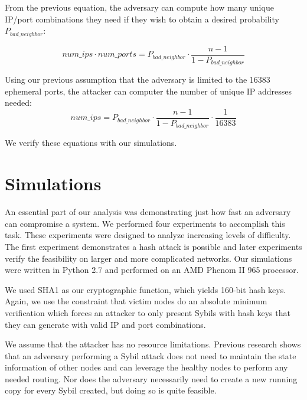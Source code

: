 \documentclass[11pt,conference]{IEEEtran}
\begin{document}
From the previous equation, the adversary can compute how many unique IP/port combinations they need if they wish to obtain a desired probability $P_{bad\_neighbor}$:

$$ num\_ips \cdot num\_ports = P_{bad\_neighbor} \cdot \frac{n - 1}{1 - P_{bad\_neighbor} }$$

Using our previous assumption that the adversary is limited to the 16383 ephemeral ports, the attacker can computer the number of unique IP addresses needed:
$$ num\_ips  =  P_{bad\_neighbor} \cdot \frac{n - 1}{1 - P_{bad\_neighbor} }  \cdot \frac{1}{16383}$$


We verify these equations with our simulations.

\section{Simulations}
\label{sec:experiments}
An essential part of our analysis was demonstrating just how fast an adversary can compromise a system.
We performed four experiments to accomplish this task.
These experiments were designed to analyze increasing levels of difficulty.
The first experiment demonstrates a hash attack is possible and later experiments verify the feasibility on larger and more complicated networks.
Our simulations were written in Python 2.7 and performed on an AMD Phenom II 965 processor. %

We used SHA1 as our cryptographic function, which yields 160-bit hash keys.
Again, we use the constraint that victim nodes do an absolute minimum verification which forces an attacker to only present Sybils with hash keys that they can generate with valid IP and port combinations.



We assume that the attacker has no resource limitations.
Previous research \cite{sybilbit} shows that an adversary performing a Sybil attack does not need to maintain the state information of other nodes and can leverage the healthy nodes to perform any needed routing.
Nor does the adversary necessarily need to create a new running copy for every Sybil created, but doing so is quite feasible. 
\end{document}
